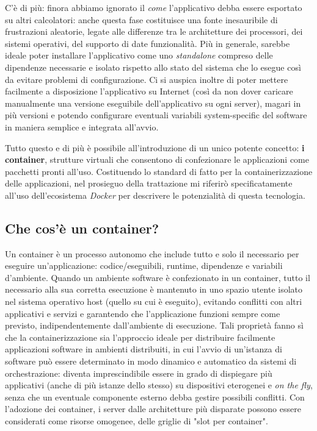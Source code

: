 C'è di più: finora abbiamo ignorato il \emph{come} l'applicativo debba essere esportato su altri calcolatori: anche questa fase costituisce una fonte inesauribile di frustrazioni aleatorie, legate alle differenze tra le architetture dei processori, dei sistemi operativi, del supporto di date funzionalità. Più in generale, sarebbe ideale poter installare l'applicativo come uno \emph{standalone} compreso delle dipendenze necessarie e isolato rispetto allo stato del sistema che lo esegue così da evitare problemi di configurazione. Ci si auspica inoltre di poter mettere facilmente a disposizione l'applicativo su Internet (così da non dover caricare manualmente una versione eseguibile dell'applicativo su ogni server), magari in più versioni e potendo configurare eventuali variabili system-specific del software in maniera semplice e integrata all'avvio.

Tutto questo e di più è possibile all'introduzione di un unico potente concetto: \textbf{i container}, strutture virtuali che consentono di confezionare le applicazioni come pacchetti pronti all'uso.
Costituendo lo standard di fatto per la containerizzazione delle applicazioni, nel prosieguo della trattazione mi riferirò specificatamente all'uso dell'ecosistema \emph{Docker} per descrivere le potenzialità di questa tecnologia.

\subsection{Che cos'è un container?}
Un container è un processo autonomo che include tutto e solo il necessario per eseguire un'applicazione: codice/eseguibili, runtime, dipendenze e variabili d'ambiente. Quando un ambiente software è confezionato in un container, tutto il necessario alla sua corretta esecuzione è mantenuto in uno spazio utente isolato nel sistema operativo host (quello su cui è eseguito), evitando conflitti con altri applicativi e servizi e garantendo che l'applicazione funzioni sempre come previsto, indipendentemente dall'ambiente di esecuzione.
Tali proprietà fanno sì che la containerizzazione sia l'approccio ideale per distribuire facilmente applicazioni software in ambienti distribuiti, in cui l'avvio di un'istanza di software può essere determinato in modo dinamico e automatico da sistemi di orchestrazione: diventa imprescindibile essere in grado di dispiegare più applicativi (anche di più istanze dello stesso) su dispositivi eterogenei e \emph{on the fly}, senza che un eventuale componente esterno debba gestire possibili conflitti. Con l'adozione dei container, i server dalle architetture più disparate possono essere considerati come risorse omogenee, delle griglie di "slot per container".

